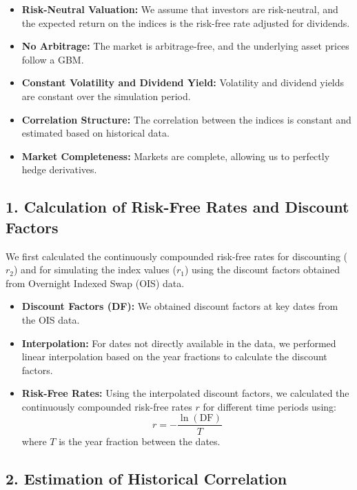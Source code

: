 \documentclass[12pt,a4paper]{article}
\begin{document}
\begin{itemize}
    \item \textbf{Risk-Neutral Valuation:} We assume that investors are risk-neutral, and the expected return on the indices is the risk-free rate adjusted for dividends.
    \item \textbf{No Arbitrage:} The market is arbitrage-free, and the underlying asset prices follow a GBM.
    \item \textbf{Constant Volatility and Dividend Yield:} Volatility and dividend yields are constant over the simulation period.
    \item \textbf{Correlation Structure:} The correlation between the indices is constant and estimated based on historical data.
    \item \textbf{Market Completeness:} Markets are complete, allowing us to perfectly hedge derivatives.
\end{itemize}

\subsection*{1. Calculation of Risk-Free Rates and Discount Factors}

We first calculated the continuously compounded risk-free rates for discounting (\( r_2 \)) and for simulating the index values (\( r_1 \)) using the discount factors obtained from Overnight Indexed Swap (OIS) data.

\begin{itemize}
    \item \textbf{Discount Factors (DF):} We obtained discount factors at key dates from the OIS data.
    \item \textbf{Interpolation:} For dates not directly available in the data, we performed linear interpolation based on the year fractions to calculate the discount factors.
    \item \textbf{Risk-Free Rates:} Using the interpolated discount factors, we calculated the continuously compounded risk-free rates \( r \) for different time periods using:
    \[
    r = -\frac{\ln(\text{DF})}{T}
    \]
    where \( T \) is the year fraction between the dates.
\end{itemize}

\subsection*{2. Estimation of Historical Correlation}
\end{document}
